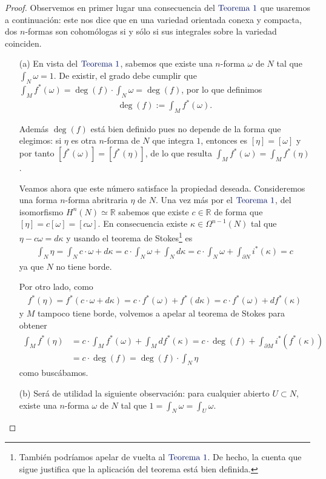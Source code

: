 \documentclass[11pt]{article}
\newcommand{\R}{\mathbb{R}}
\newcommand{\paint}[1]{\color{color}{#1}}
\newcommand{\tpaing}[1]{\paint{\text{#1}}}
\begin{document}
\begin{proof} Observemos en primer lugar una consecuencia del $\tpaing{Teorema $1$}$ que usaremos a continuación: este nos dice que en una variedad orientada conexa y compacta, dos $n$-formas son cohomólogas si y sólo si sus integrales sobre la variedad coinciden.
\begin{itemize}[listparindent = \parindent] 
\item[(a)] En vista del $\tpaing{Teorema $1$}$, sabemos que existe una $n$-forma $\omega$ de $N$ tal que $\int_N \omega = 1$. De existir, el grado debe cumplir que $\int_M f^*(\omega) = \deg(f) \cdot \int_N \omega = \deg(f)$, por lo que definimos
\begin{align*}
\deg(f) := \int_M f^*(\omega).
\end{align*}

Además $\deg(f)$ está bien definido pues no depende de la forma que elegimos: si $\eta$ es otra $n$-forma de $N$ que integra $1$, entonces es $[\eta] = [\omega]$ y por tanto $[f^*(\omega)] = [f^*(\eta)]$, de lo que resulta $\int_M f^*(\omega) = \int_M f^*(\eta)$. 

Veamos ahora que este número satisface la propiedad deseada. Consideremos una forma $n$-forma abritraria $\eta$ de $N$. Una vez más por el $\tpaing{Teorema $1$}$, del isomorfismo $H^n(N) \simeq \R$ sabemos que existe $c \in \R$ de forma que $[\eta] = c[\omega] = [c\omega]$. En consecuencia existe $\kappa \in \Omega^{n-1}(N)$ tal que $\eta - c\omega = d\kappa$ y usando el teorema de Stokes\footnote{También podríamos apelar de vuelta al $\tpaing{Teorema $1$}$. De hecho, la cuenta que sigue justifica que la aplicación del teorema está bien definida.} es
\begin{align*}
\int_N \eta = \int_N c \cdot \omega + d\kappa = c\cdot\int_N\omega + \int_Nd\kappa = c\cdot\int_N\omega + \int_{\partial N}i^*(\kappa) = c
\end{align*}  
ya que $N$ no tiene borde. 

Por otro lado, como
\begin{align*}
f^*(\eta) = f^*(c\cdot\omega + d\kappa) = c\cdot f^*(\omega) + f^*(d\kappa) = c\cdot f^*(\omega) + df^*(\kappa)
\end{align*}
y $M$ tampoco tiene borde, volvemos a apelar al teorema de Stokes para obtener
\begin{align*}
\int_M f^*(\eta) &= c\cdot\int_M f^*(\omega) + \int_M df^*(\kappa) = c \cdot \deg(f) + \int_{\partial M}i^*(f^*(\kappa))\\
&= c \cdot \deg(f) = \deg(f) \cdot \int_N \eta
\end{align*}
como buscábamos.
\item[(b)] Será de utilidad la siguiente observación: para cualquier abierto $U \subset N$, existe una $n$-forma $\omega$ de $N$ tal que $1 = \int_N \omega = \int_U \omega$. 


\end{itemize}
\end{proof}
\end{document}
